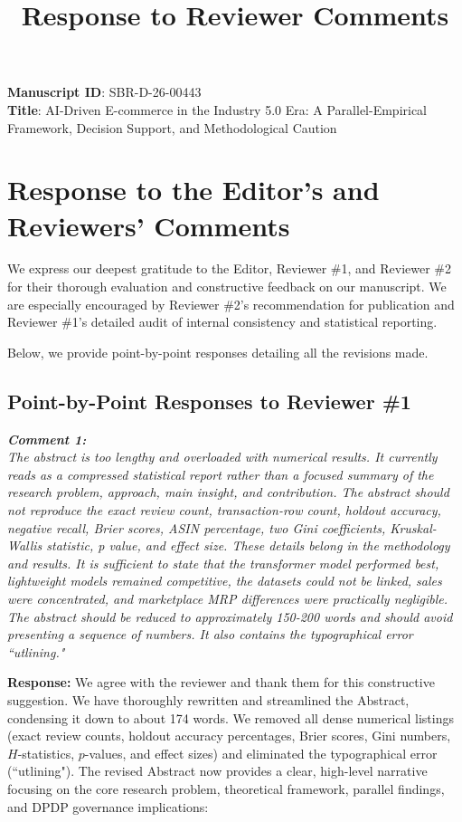 \documentclass[11pt]{article}
\title{\textbf{Response to Reviewer Comments}}
\date{}
\newcommand{\comment}[1]{\vspace{12pt}\noindent\colorbox{gray!10}{\parbox{\dimexpr\textwidth-2\fboxsep\relax}{\color{commentcolor}\itshape #1}}\vspace{6pt}}
\newcommand{\response}{\vspace{6pt}\noindent\textbf{Response: }}
\begin{document}
\maketitle

\noindent\textbf{Manuscript ID}: SBR-D-26-00443 \\
\textbf{Title}: AI-Driven E-commerce in the Industry 5.0 Era: A Parallel-Empirical Framework, Decision Support, and Methodological Caution

\section*{Response to the Editor's and Reviewers' Comments}
We express our deepest gratitude to the Editor, Reviewer \#1, and Reviewer \#2 for their thorough evaluation and constructive feedback on our manuscript. We are especially encouraged by Reviewer \#2's recommendation for publication and Reviewer \#1's detailed audit of internal consistency and statistical reporting. 

Below, we provide point-by-point responses detailing all the revisions made.

\subsection*{Point-by-Point Responses to Reviewer \#1}

\comment{\textbf{Comment 1:} \\
The abstract is too lengthy and overloaded with numerical results. It currently reads as a compressed statistical report rather than a focused summary of the research problem, approach, main insight, and contribution. The abstract should not reproduce the exact review count, transaction-row count, holdout accuracy, negative recall, Brier scores, ASIN percentage, two Gini coefficients, Kruskal-Wallis statistic, p value, and effect size. These details belong in the methodology and results. It is sufficient to state that the transformer model performed best, lightweight models remained competitive, the datasets could not be linked, sales were concentrated, and marketplace MRP differences were practically negligible. The abstract should be reduced to approximately 150-200 words and should avoid presenting a sequence of numbers. It also contains the typographical error ``utlining."}

\response
We agree with the reviewer and thank them for this constructive suggestion. We have thoroughly rewritten and streamlined the Abstract, condensing it down to about 174 words. We removed all dense numerical listings (exact review counts, holdout accuracy percentages, Brier scores, Gini numbers, $H$-statistics, $p$-values, and effect sizes) and eliminated the typographical error (``utlining"). The revised Abstract now provides a clear, high-level narrative focusing on the core research problem, theoretical framework, parallel findings, and DPDP governance implications:
\end{document}
